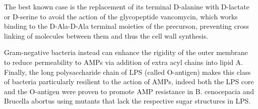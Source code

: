 \documentclass[a4paper,11pt]{extreport}
\begin{document}
The best known case is the replacement of its terminal D-alanine with D-lactate or D-serine\cite{Bugg1991} to avoid the action of the glycopeptide vancomycin, which works binding to the D-Ala-D-Ala terminal moieties of the precurson, preventing cross linking of molecules between them and thus the cell wall synthesis.\cite{Brotz1998}

Gram-negative bacteria instead can enhance the rigidity of the outer membrane to reduce permeability to AMPs via addition of extra acyl chains into lipid A.\cite{Guo1998,Bishop2000}
Finally, the long polysaccharide chain of LPS (called O-antigen) makes this class of bacteria particularly resilient to the action of AMPs,\cite{Silhavy 2010}
indeed both the LPS core and the O-antigen were proven to promote AMP resistance in B.  cenocepacia and Brucella abortus using mutants that lack the respective sugar structures in LPS.\cite{Loutet2006,Allen1998}
\end{document}
